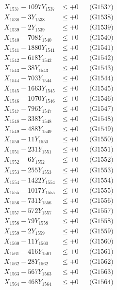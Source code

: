 \documentclass[a4paper,10pt]{article}
\begin{document}
{\begin{align}
X_{1537} - 1097Y_{1537} &\leq +0 && \text{(G1537)} \\
X_{1538} - 3Y_{1538} &\leq +0 && \text{(G1538)} \\
X_{1539} - 2Y_{1539} &\leq +0 && \text{(G1539)} \\
X_{1540} - 708Y_{1540} &\leq +0 && \text{(G1540)} \\
\allowbreak
X_{1541} - 1880Y_{1541} &\leq +0 && \text{(G1541)} \\
X_{1542} - 618Y_{1542} &\leq +0 && \text{(G1542)} \\
X_{1543} - 38Y_{1543} &\leq +0 && \text{(G1543)} \\
X_{1544} - 703Y_{1544} &\leq +0 && \text{(G1544)} \\
X_{1545} - 1663Y_{1545} &\leq +0 && \text{(G1545)} \\
X_{1546} - 1070Y_{1546} &\leq +0 && \text{(G1546)} \\
X_{1547} - 796Y_{1547} &\leq +0 && \text{(G1547)} \\
X_{1548} - 338Y_{1548} &\leq +0 && \text{(G1548)} \\
X_{1549} - 488Y_{1549} &\leq +0 && \text{(G1549)} \\
X_{1550} - 11Y_{1550} &\leq +0 && \text{(G1550)} \\
\allowbreak
X_{1551} - 231Y_{1551} &\leq +0 && \text{(G1551)} \\
X_{1552} - 6Y_{1552} &\leq +0 && \text{(G1552)} \\
X_{1553} - 255Y_{1553} &\leq +0 && \text{(G1553)} \\
X_{1554} - 1422Y_{1554} &\leq +0 && \text{(G1554)} \\
X_{1555} - 1017Y_{1555} &\leq +0 && \text{(G1555)} \\
X_{1556} - 731Y_{1556} &\leq +0 && \text{(G1556)} \\
X_{1557} - 572Y_{1557} &\leq +0 && \text{(G1557)} \\
X_{1558} - 79Y_{1558} &\leq +0 && \text{(G1558)} \\
X_{1559} - 2Y_{1559} &\leq +0 && \text{(G1559)} \\
X_{1560} - 11Y_{1560} &\leq +0 && \text{(G1560)} \\
\allowbreak
X_{1561} - 416Y_{1561} &\leq +0 && \text{(G1561)} \\
X_{1562} - 28Y_{1562} &\leq +0 && \text{(G1562)} \\
X_{1563} - 567Y_{1563} &\leq +0 && \text{(G1563)} \\
X_{1564} - 468Y_{1564} &\leq +0 && \text{(G1564)} \\

\end{align}}
\end{document}

